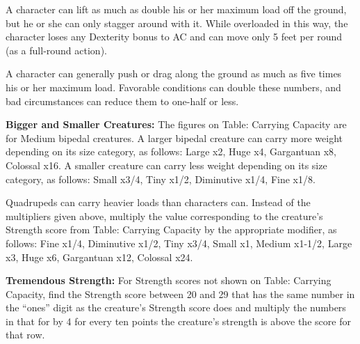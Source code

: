 \documentclass{article}
\begin{document}
A character can lift as much as double his or her maximum load off the ground, 
but he or she can only stagger around with it. While overloaded in this way, the 
character loses any Dexterity bonus to AC and can move only 5 feet per round (as 
a full-round action).

A character can generally push or drag along the ground as much as five times his 
or her maximum load. Favorable conditions can double these numbers, and bad circumstances 
can reduce them to one-half or less.

\textbf{Bigger and Smaller Creatures:} The figures on Table: Carrying Capacity 
are for Medium bipedal creatures. A larger bipedal creature can carry more weight 
depending on its size category, as follows: Large x2, Huge x4, Gargantuan x8, Colossal 
x16. A smaller creature can carry less weight depending on its size category, as 
follows: Small x3/4, Tiny x1/2, Diminutive x1/4, Fine x1/8.

Quadrupeds can carry heavier loads than characters can. Instead of the multipliers 
given above, multiply the value corresponding to the creature's Strength score 
from Table: Carrying Capacity by the appropriate modifier, as follows: Fine x1/4, 
Diminutive x1/2, Tiny x3/4, Small x1, Medium x1-1/2, Large x3, Huge x6, Gargantuan 
x12, Colossal x24.

\textbf{Tremendous Strength:} For Strength scores not shown on Table: Carrying 
Capacity, find the Strength score between 20 and 29 that has the same number in 
the ``ones'' digit as the creature's Strength score does and multiply the numbers 
in that for by 4 for every ten points the creature's strength is above the score 
for that row.
\end{document}
